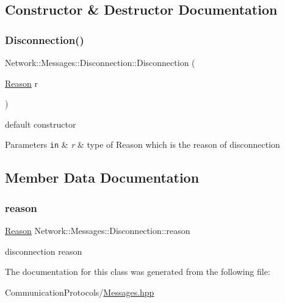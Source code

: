 \subsection{Constructor \& Destructor Documentation}
\mbox{\label{class_network_1_1_messages_1_1_disconnection_a36af05a34ca6caf93bc68f2562a08166}} 
\subsubsection{\texorpdfstring{Disconnection()}{Disconnection()}}
{\footnotesize\ttfamily Network\+::\+Messages\+::\+Disconnection\+::\+Disconnection (\begin{DoxyParamCaption}\item[{\hyperlink{class_network_1_1_messages_1_1_disconnection_a0c473c9cdef42320c45dbc239f1c5c21}{Reason}}]{r }\end{DoxyParamCaption})\hspace{0.3cm}{\ttfamily [inline]}}



default constructor 


\begin{DoxyParams}[1]{Parameters}
\mbox{\tt in}  & {\em r} & type of Reason which is the reason of disconnection \\
\hline
\end{DoxyParams}


\subsection{Member Data Documentation}
\mbox{\label{class_network_1_1_messages_1_1_disconnection_a48eb1be4be59d3e75de7bf203f092899}} 
\subsubsection{\texorpdfstring{reason}{reason}}
{\footnotesize\ttfamily \hyperlink{class_network_1_1_messages_1_1_disconnection_a0c473c9cdef42320c45dbc239f1c5c21}{Reason} Network\+::\+Messages\+::\+Disconnection\+::reason}

disconnection reason 

The documentation for this class was generated from the following file\+:\begin{DoxyCompactItemize}
\item 
Communication\+Protocols/\hyperlink{_messages_8hpp}{Messages.\+hpp}\end{DoxyCompactItemize}
